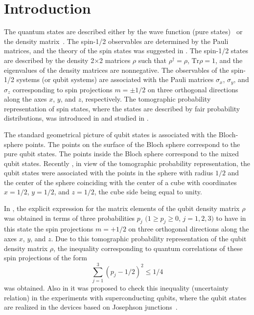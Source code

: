 \documentclass[12pt]{article}
\begin{document}
\section{Introduction}
The quantum states are described either by the wave function (pure
states)~\cite{Schr26} or the density
matrix~\cite{Landau27,vonNeumann27}. The spin-1/2 observables are
determined by the Pauli matrices, and the theory of the spin states
was suggested in \cite{Pauli}.  The spin-1/2 states are described by
the density 2$\times$2 matrices $\rho$ such that $\rho^\dag=\rho$,
$\mbox{Tr}\rho=1$, and the eigenvalues of the density matrices are
nonnegative. The observables of the spin-1/2 systems (or qubit
systems) are associated with the Pauli matrices $\sigma_x$,
$\sigma_y$, and $\sigma_z$ corresponding to spin projections
$m=\pm1/2$ on three orthogonal directions along the axes $x$, $y$,
and $z$, respectively. The tomographic probability representation of
spin states, where the states are described by fair probability
distributions, was introduced in \cite{DodPLA,OlgaJETP} and studied
in
\cite{Weigert1,Wiegert2,Painini,Bregence,Filipov,CastanosJPA,Klimov,OlgaWigner}.

The standard geometrical picture of qubit states is associated with
the Bloch-sphere points. The points on the surface of the Bloch
sphere correspond to the pure qubit states. The points inside the
Bloch sphere correspond to the mixed qubit states. Recently
\cite{Patrizia}, in view of the tomographic probability
representation, the qubit states were associated with the points in
the sphere with radius $1/2$ and the center of the sphere coinciding
with the center of a cube with coordinates $x=1/2$, $y=1/2$, and
$z=1/2$, the cube side being equal to unity.

In \cite{Patrizia}, the explicit expression for the matrix elements
of the qubit density matrix $\rho$ was obtained in terms of three
probabilities $p_j$ $(1\geq p_j\geq 0$, $j=1,2,3)$ to have in this
state the spin projections $m=+1/2$ on three orthogonal directions
along the axes $x$, $y$, and $z$. Due to this tomographic
probability representation of the qubit density matrix $\rho$, the
inequality corresponding to quantum correlations of these spin
projections of the form
\begin{equation}\label{intq}
\sum_{j=1}^3(p_j-1/2)^2\leq 1/4
\end{equation}
was obtained. Also in \cite{Patrizia} it was proposed to check this
inequality (uncertainty relation) in the experiments with
superconducting qubits, where the qubit states are realized in the
devices based on Josephson
junctions~\cite{Shalibo,Martinis,Astafiev,Ustinov}.
\end{document}
